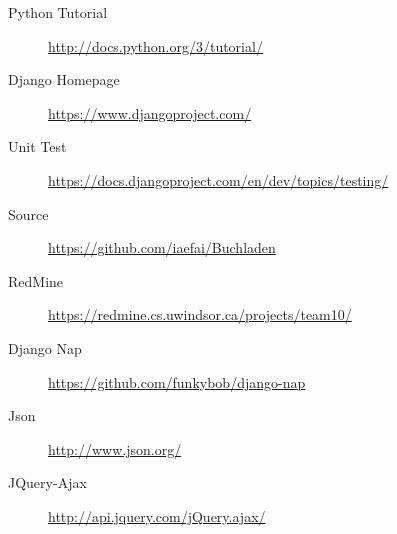 \documentclass[11pt]{article}
\begin{document}
\begin{description}
\item[Python Tutorial] \href{http://docs.python.org/3/tutorial/}{http://docs.python.org/3/tutorial/}
\item[Django Homepage] \href{https://www.djangoproject.com/}{https://www.djangoproject.com/}
\item[Unit Test] \href{https://docs.djangoproject.com/en/dev/topics/testing/}{https://docs.djangoproject.com/en/dev/topics/testing/}
\item[Source] \href{https://github.com/iaefai/Buchladen}{https://github.com/iaefai/Buchladen}
\item[RedMine]
  \href{https://redmine.cs.uwindsor.ca/projects/team10/}{https://redmine.cs.uwindsor.ca/projects/team10/}
\item[Django Nap] \href{https://github.com/funkybob/django-nap}{https://github.com/funkybob/django-nap}
\item[Json] \href{http://www.json.org/}{http://www.json.org/}
\item[JQuery-Ajax] \href{http://api.jquery.com/jQuery.ajax/}{http://api.jquery.com/jQuery.ajax/}
\end{description}
\end{document}
